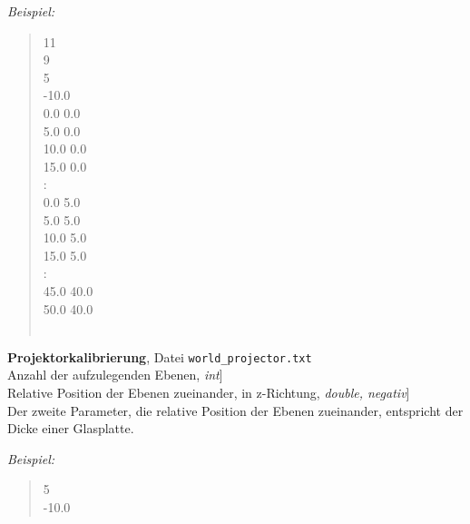 \emph{Beispiel:}
\begin{quote}
11\\
9\\
5\\
-10.0\\
0.0 0.0\\
5.0 0.0\\
10.0 0.0\\
15.0 0.0\\
:\\
0.0 5.0\\
5.0 5.0\\
10.0 5.0\\
15.0 5.0\\
:\\
45.0 40.0\\
50.0 40.0\\\\
\end{quote}

\textbf{Projektorkalibrierung}, Datei \verb$world_projector.txt$\vspace{11pt}\\
\text{[}Anzahl der aufzulegenden Ebenen, \emph{int}]\\
\text{[}Relative Position der Ebenen zueinander, in z-Richtung, \emph{double, negativ}]\\


Der zweite Parameter, die relative Position der Ebenen zueinander, entspricht der Dicke einer Glasplatte.

\emph{Beispiel:}
\begin{quote}
5\\
-10.0\\
\end{quote}

